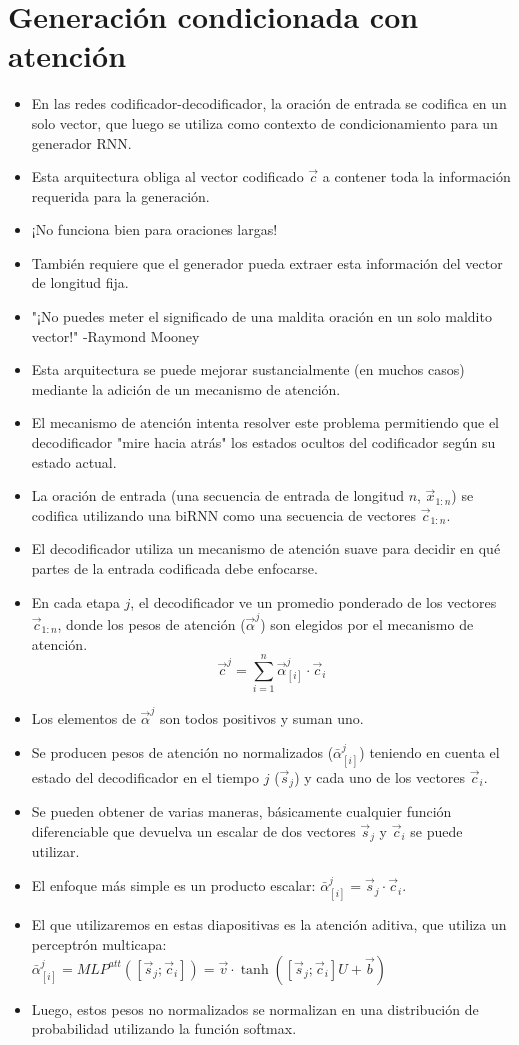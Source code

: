 \section{Generación condicionada con atención}
\begin{itemize}
\item En las redes codificador-decodificador, la oración de entrada se codifica en un solo vector, que luego se utiliza como contexto de condicionamiento para un generador RNN.
\item Esta arquitectura obliga al vector codificado $\vec{c}$ a contener toda la información requerida para la generación.
\item ¡No funciona bien para oraciones largas!
\item También requiere que el generador pueda extraer esta información del vector de longitud fija.
\item "¡No puedes meter el significado de una maldita oración en un solo maldito vector!" -Raymond Mooney
\item Esta arquitectura se puede mejorar sustancialmente (en muchos casos) mediante la adición de un mecanismo de atención.
\item El mecanismo de atención intenta resolver este problema permitiendo que el decodificador "mire hacia atrás" los estados ocultos del codificador según su estado actual.
\item La oración de entrada (una secuencia de entrada de longitud $n$, $\vec{x}_{1:n}$) se codifica utilizando una biRNN como una secuencia de vectores $\vec{c}_{1:n}$.
\item El decodificador utiliza un mecanismo de atención suave para decidir en qué partes de la entrada codificada debe enfocarse.
\item En cada etapa $j$, el decodificador ve un promedio ponderado de los vectores $\vec{c}_{1:n}$, donde los pesos de atención ($\vec{\alpha}^j$) son elegidos por el mecanismo de atención.
\begin{displaymath}
\vec{c}^j = \sum_{i=1}^{n} \vec{\alpha}_{[i]}^{j}\cdot \vec{c}_i
\end{displaymath}
\item Los elementos de $\vec{\alpha}^j$ son todos positivos y suman uno.
\item Se producen pesos de atención no normalizados ($\bar{\alpha}_{[i]}^j$) teniendo en cuenta el estado del decodificador en el tiempo $j$ ($\vec{s}_j$) y cada uno de los vectores $\vec{c}_i$.
\item Se pueden obtener de varias maneras, básicamente cualquier función diferenciable que devuelva un escalar de dos vectores $\vec{s}_j$ y $\vec{c}_i$ se puede utilizar.
\item El enfoque más simple es un producto escalar: $\bar{\alpha}_{[i]}^j = \vec{s}_j \cdot \vec{c}_i$.
\item El que utilizaremos en estas diapositivas es la atención aditiva, que utiliza un perceptrón multicapa: $\bar{\alpha}_{[i]}^j = MLP^{att}([\vec{s}_j;\vec{c}_i]) = \vec{v} \cdot \operatorname{tanh}([\vec{s}_j;\vec{c}_i]U +\vec{b})$
\item Luego, estos pesos no normalizados se normalizan en una distribución de probabilidad utilizando la función softmax.


\end{itemize}
